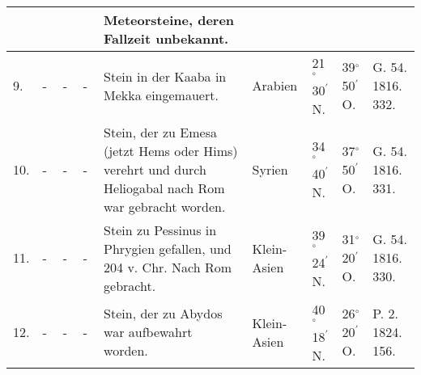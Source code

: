 \documentclass[a4paper, 8pt, oneside, polutonikogreek, german]{article}
\begin{document}
\begin{landscape}
\begin{table}[!ht]
\begin{tabular}{|l|l|l|l|l|l|l|l|l|}
          &   &   &   & Meteorsteine, deren Fallzeit unbekannt. &   &   &   &   \\ \hline
        9. & - & - & - & Stein in der Kaaba in Mekka eingemauert. & Arabien & 21$^\circ$ 30$^\prime$ N. & 39$^\circ$ 50$^\prime$ O. & G. 54. 1816. 332. \\ \hline
        10. & - & - & - & Stein, der zu Emesa (jetzt Hems oder Hims) verehrt und durch Heliogabal nach Rom war gebracht worden. & Syrien & 34$^\circ$ 40$^\prime$ N. & 37$^\circ$ 50$^\prime$ O. & G. 54. 1816. 331. \\ \hline
        11. & - & - & - & Stein zu Pessinus in Phrygien gefallen, und 204 v. Chr. Nach Rom gebracht. & Klein-Asien & 39$^\circ$ 24$^\prime$ N. & 31$^\circ$ 20$^\prime$ O. & G. 54. 1816. 330. \\ \hline
        12. & - & - & - & Stein, der zu Abydos war aufbewahrt worden. & Klein-Asien & 40$^\circ$ 18$^\prime$ N. & 26$^\circ$ 20$^\prime$ O. & P. 2. 1824. 156. \\ \hline
    \end{tabular}
\end{table}
\end{landscape}
\clearpage
\end{document}
